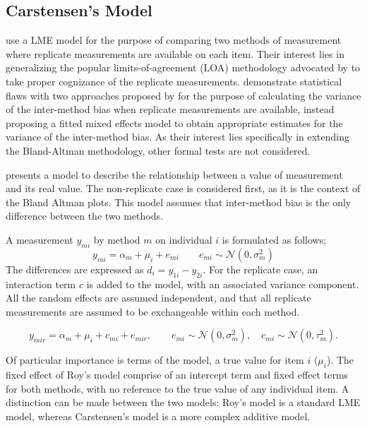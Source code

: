 \documentclass[12pt, a4paper]{report}
\theoremstyle{plain}
\theoremstyle{definition}
\theoremstyle{remark}
\begin{document}
\subsection{Carstensen's Model}

\citet{BXC2008} use a LME model for the purpose of comparing two methods of measurement where replicate measurements are available on each item. Their interest lies in generalizing the popular limits-of-agreement (LOA) methodology advocated by \citet{BA86} to take proper cognizance of the replicate measurements. \citet{BXC2008} demonstrate statistical flaws with two approaches proposed by \citet{BA99} for the purpose of calculating the variance of the inter-method bias when replicate measurements are available, instead proposing a fitted mixed effects model to obtain appropriate estimates for the variance of the inter-method bias.  As their interest lies specifically in extending the Bland-Altman methodology, other formal tests are not considered.

\citet{BXC2004} presents a model to describe the relationship between a value of measurement and its
real value. The non-replicate case is considered first, as it is the context of the Bland Altman plots. This model assumes that inter-method bias is the only difference between the two methods.

A measurement $y_{mi}$ by method $m$ on individual $i$ is formulated as follows;
\begin{equation}
y_{mi}  = \alpha_{m} + \mu_{i} + e_{mi} \qquad  e_{mi} \sim
\mathcal{N}(0,\sigma^{2}_{m})
\end{equation}
The differences are expressed as $d_{i} = y_{1i} - y_{2i}$. For the replicate case, an interaction term $c$ is added to the model, with an associated variance component. All the random effects are assumed independent, and that all replicate measurements are assumed to be exchangeable within each method.

\begin{equation}
y_{mir}  = \alpha_{m} + \mu_{i} + c_{mi} + e_{mir}, \qquad  e_{mi}
\sim \mathcal{N}(0,\sigma^{2}_{m}), \quad c_{mi} \sim \mathcal{N}(0,\tau^{2}_{m}).
\end{equation}

Of particular importance is terms of the model, a true value for item $i$ ($\mu_{i}$).  The fixed effect of Roy's model comprise of an intercept term and fixed effect terms for both methods, with no reference to the true value of any individual item. A distinction can be made between the two models: Roy's model is a standard LME model, whereas Carstensen's model is a more complex additive model.
\end{document}
